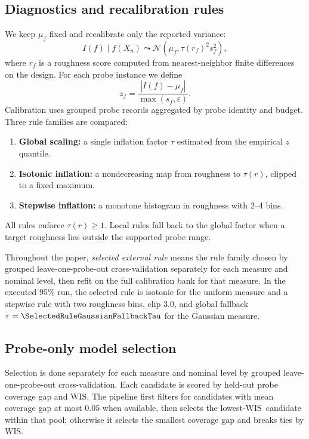 \documentclass{article}
\newcommand{\wis}{\ensuremath{\mathrm{WIS}}}
\begin{document}
\subsection{Diagnostics and recalibration rules}
We keep $\mu_f$ fixed and recalibrate only the reported variance:
\[
I(f)\mid f(X_n)\leadsto \mathcal{N}\!\left(\mu_f,\tau(r_f)^2 s_f^2\right),
\]
where $r_f$ is a roughness score computed from nearest-neighbor finite differences on the design. For each probe instance we define
\[
z_f=\frac{|I(f)-\mu_f|}{\max(s_f,\varepsilon)}.
\]
Calibration uses grouped probe records aggregated by probe identity and budget. Three rule families are compared:
\begin{enumerate}
  \item \textbf{Global scaling:} a single inflation factor $\tau$ estimated from the empirical $z$ quantile.
  \item \textbf{Isotonic inflation:} a nondecreasing map from roughness to $\tau(r)$, clipped to a fixed maximum.
  \item \textbf{Stepwise inflation:} a monotone histogram in roughness with 2--4 bins.
\end{enumerate}
All rules enforce $\tau(r)\geq 1$. Local rules fall back to the global factor when a target roughness lies outside the supported probe range.

Throughout the paper, \emph{selected external rule} means the rule family chosen by grouped leave-one-probe-out cross-validation separately for each measure and nominal level, then refit on the full calibration bank for that measure. In the executed 95\% run, the selected rule is isotonic for the uniform measure and a stepwise rule with two roughness bins, clip $3.0$, and global fallback $\tau=\SelectedRuleGaussianFallbackTau$ for the Gaussian measure.

\subsection{Probe-only model selection}
Selection is done separately for each measure and nominal level by grouped leave-one-probe-out cross-validation. Each candidate is scored by held-out probe coverage gap and \wis. The pipeline first filters for candidates with mean coverage gap at most $0.05$ when available, then selects the lowest-\wis\ candidate within that pool; otherwise it selects the smallest coverage gap and breaks ties by \wis.
\end{document}
